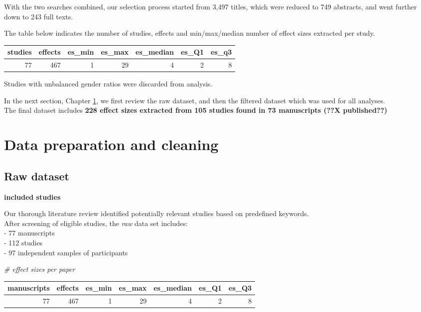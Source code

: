 \documentclass[
]{book}
\begin{document}
With the two searches combined, our selection process started from 3,497 titles, which were reduced to 749 abstracts,
and went further down to 243 full texts.

The table below indicates the number of studies, effects and min/max/median number of effect sizes extracted per study.

\begin{table}
\centering
\begin{tabular}{r|r|r|r|r|r|r}
\hline
studies & effects & es\_min & es\_max & es\_median & es\_Q1 & es\_q3\\
\hline
77 & 467 & 1 & 29 & 4 & 2 & 8\\
\hline
\end{tabular}
\end{table}

Studies with unbalanced gender ratios were discarded from analysis.

In the next section, Chapter \ref{datachecks}, we first review the raw dataset, and then the filtered dataset which was used for all analyses.\\
The final dataset includes \textbf{228 effect sizes extracted from 105 studies found in 73 manuscripts (??X published??)}

\hypertarget{datachecks}{%
\chapter{Data preparation and cleaning}\label{datachecks}}

\hypertarget{rawdata}{%
\section{Raw dataset}\label{rawdata}}

\textbf{included studies}

Our thorough literature review identified potentially relevant studies based on predefined keywords.\\
After screening of eligible studies, the \emph{raw} data set includes:\\
- 77 manuscripts\\
- 112 studies\\
- 97 independent samples of participants

\emph{\# effect sizes per paper}

\begin{table}
\centering
\begin{tabular}{r|r|r|r|r|r|r}
\hline
manuscripts & effects & es\_min & es\_max & es\_median & es\_Q1 & es\_Q3\\
\hline
77 & 467 & 1 & 29 & 4 & 2 & 8\\
\hline
\end{tabular}
\end{table}
\end{document}

